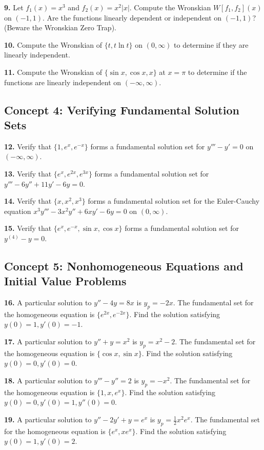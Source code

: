 \documentclass[12pt]{article}
\begin{document}
\textbf{9.} Let $f_1(x) = x^3$ and $f_2(x) = x^2|x|$. Compute the Wronskian $W[f_1, f_2](x)$ on $(-1, 1)$. Are the functions linearly dependent or independent on $(-1, 1)$? (Beware the Wronskian Zero Trap).

\textbf{10.} Compute the Wronskian of $\{t, t\ln t\}$ on $(0, \infty)$ to determine if they are linearly independent.

\textbf{11.} Compute the Wronskian of $\{\sin x, \cos x, x\}$ at $x=\pi$ to determine if the functions are linearly independent on $(-\infty, \infty)$.

\subsection*{Concept 4: Verifying Fundamental Solution Sets}
\textbf{12.} Verify that $\{1, e^x, e^{-x}\}$ forms a fundamental solution set for $y''' - y' = 0$ on $(-\infty, \infty)$.

\textbf{13.} Verify that $\{e^x, e^{2x}, e^{3x}\}$ forms a fundamental solution set for $y''' - 6y'' + 11y' - 6y = 0$.

\textbf{14.} Verify that $\{x, x^2, x^3\}$ forms a fundamental solution set for the Euler-Cauchy equation $x^3 y''' - 3x^2 y'' + 6x y' - 6y = 0$ on $(0, \infty)$.

\textbf{15.} Verify that $\{e^x, e^{-x}, \sin x, \cos x\}$ forms a fundamental solution set for $y^{(4)} - y = 0$.

\subsection*{Concept 5: Nonhomogeneous Equations and Initial Value Problems}
\textbf{16.} A particular solution to $y'' - 4y = 8x$ is $y_p = -2x$. The fundamental set for the homogeneous equation is $\{e^{2x}, e^{-2x}\}$. Find the solution satisfying $y(0)=1, y'(0)=-1$.

\textbf{17.} A particular solution to $y'' + y = x^2$ is $y_p = x^2 - 2$. The fundamental set for the homogeneous equation is $\{\cos x, \sin x\}$. Find the solution satisfying $y(0)=0, y'(0)=0$.

\textbf{18.} A particular solution to $y''' - y'' = 2$ is $y_p = -x^2$. The fundamental set for the homogeneous equation is $\{1, x, e^x\}$. Find the solution satisfying $y(0)=0, y'(0)=1, y''(0)=0$.

\textbf{19.} A particular solution to $y'' - 2y' + y = e^x$ is $y_p = \frac{1}{2}x^2e^x$. The fundamental set for the homogeneous equation is $\{e^x, xe^x\}$. Find the solution satisfying $y(0)=1, y'(0)=2$.
\end{document}
